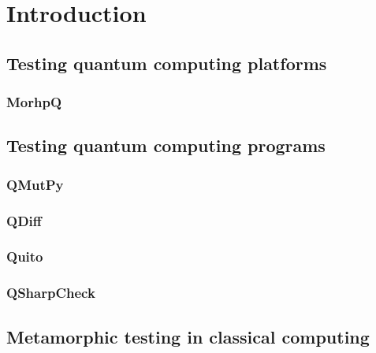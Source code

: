 \cleardoublepage

\chapter{Introduction}
\label{Ch1:Intro}

\section{Testing quantum computing platforms}
\label{Ch1.1:TPlat}

\subsection{MorhpQ}
\label{Ch1:MorphQ}

\section{Testing quantum computing programs}
\label{Ch1.2:TQP}

\subsection{QMutPy}
\label{Ch1:QMutPy}

\subsection{QDiff}
\label{Ch1.1:QDiff}

\subsection{Quito}
\label{Ch1.1:Quito}

\subsection{QSharpCheck}
\label{Ch1.1:QSharpCheck}

\section{Metamorphic testing in classical computing}